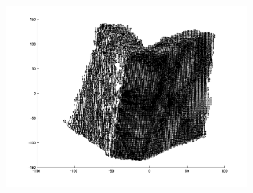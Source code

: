 \begin{figure}[H]
\begin{subfigure}[b]{0.3\textwidth}
		\includegraphics[width=\textwidth]{Images/Book3.png}
		\caption{}
	\end{subfigure}
	

\end{figure}
